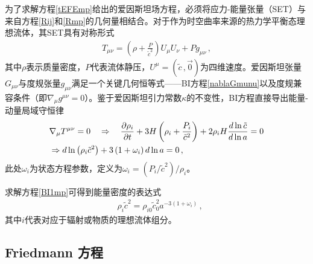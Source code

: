 \documentclass[jkps,preprint,fleqn]{revtex4}
\newcommand{\tc}{\tilde{c}}
\begin{document}
为了求解方程\eqref{tEFEmp}给出的爱因斯坦场方程，必须将应力-能量张量（SET）与来自方程\eqref{Rij}和\eqref{Rmp}的几何量相结合。对于作为时空曲率来源的热力学平衡态理想流体，其SET具有对称形式
\begin{align} T_{\mu\nu} = \left( \rho + \frac{P}{\tc^2} \right) U_{\mu} U_{\nu} + P g_{\mu\nu} \label{Tmunump} \,, \end{align}
其中$\rho$表示质量密度，$P$代表流体静压，$U^{\mu} = (\tc\,,\vec{0})$为四维速度。爱因斯坦张量$G_{\mu\nu}$与度规张量$g_{\mu\nu}$满足一个关键几何恒等式——BI方程\eqref{nablaGmunu}以及度规兼容条件（即$\nabla_{\mu} g^{\mu\nu} = 0$）。鉴于爱因斯坦引力常数$\kappa$的不变性，BI方程直接导出能量-动量局域守恒律
\begin{align} &\nabla_{\mu} \tensor{T}{^\mu^\nu} = 0 \quad \Rightarrow \quad \frac{\partial \rho_i}{\partial t} + 3 H \left( \rho_i + \frac{P_i}{\tc^2} \right) + 2 \rho_i H \frac{d \ln \tc}{d \ln a} = 0 \nonumber \\ &\Rightarrow d \ln \left( \rho_i \tc^2 \right) + 3 \left( 1 + \omega_i \right) d \ln a = 0 \label{BI1mp} \,, \end{align}
此处$\omega_i$为状态方程参数，定义为$\omega_i = (P_i/\tc^2)/\rho_i$。

求解方程\eqref{BI1mp}可得到能量密度的表达式
\begin{align} &\rho_i \tc^{2} = \rho_{i0} \tc_0^2 a^{-3 (1 + \omega_i)} \label{rhomp} \,,\end{align}
其中$i$代表对应于辐射或物质的理想流体组分。
\subsection{Friedmann 方程}\label{subsec:FE}
\end{document}
